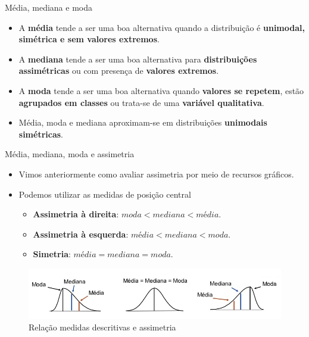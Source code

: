 \documentclass[
  ignorenonframetext,
  serif,
  professionalfont,
  usenames,
  dvipsnames,
  aspectratio = 169]{beamer}
\providecommand{\tightlist}{%
  \setlength{\itemsep}{0pt}\setlength{\parskip}{0pt}}
\renewcommand{\tightlist}{%
  \setlength{\itemsep}{0\baselineskip}
  \setlength{\parskip}{0.25\baselineskip}
}
\begin{document}
\begin{frame}{Média, mediana e moda}
\label{muxe9dia-mediana-e-moda-1}
\begin{itemize}
\item
  A \textbf{média} tende a ser uma boa alternativa quando a distribuição
  é \textbf{unimodal, simétrica e sem valores extremos}.
\item
  A \textbf{mediana} tende a ser uma boa alternativa para
  \textbf{distribuições assimétricas} ou com presença de
  \textbf{valores extremos}.
\item
  A \textbf{moda} tende a ser uma boa alternativa quando
  \textbf{valores se repetem}, estão \textbf{agrupados em classes} ou
  trata-se de uma \textbf{variável qualitativa}.
\item
  Média, moda e mediana aproximam-se em distribuições
  \textbf{unimodais simétricas}.
\end{itemize}
\end{frame}

\begin{frame}{Média, mediana, moda e assimetria}
\label{muxe9dia-mediana-moda-e-assimetria}
\begin{itemize}
\item
  Vimos anteriormente como avaliar assimetria por meio de recursos
  gráficos.
\item
  Podemos utilizar as medidas de posição central

  \begin{itemize}
  \tightlist
  \item
    \textbf{Assimetria à direita}: \(moda < mediana < média\).
  \item
    \textbf{Assimetria à esquerda}: \(média < mediana < moda\).
  \item
    \textbf{Simetria}: \(média = mediana = moda\).
  \end{itemize}
\end{itemize}

\begin{figure}

{\centering \includegraphics[width=0.9\linewidth]{./img/assimetria} 

}

\caption{Relação medidas descritivas e assimetria}\label{fig:unnamed-chunk-9}
\end{figure}
\end{frame}
\end{document}
